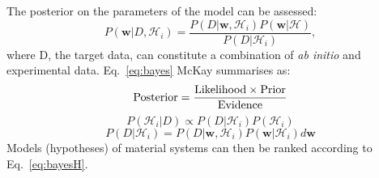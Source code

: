 The posterior on the parameters of the model can be assessed:
%
\begin{equation}
\label{eq:bayes}
P(\mathbf{w}|D, \mathcal{H}_{i}) = \frac{P(D|\mathbf{w}, \mathcal{H}_{i})P(\mathbf{w}|\mathcal{H})}{P(D|\mathcal{H}_{i})},
\end{equation}
%
where D, the target data, can constitute a combination of {\it ab initio} and experimental data. Eq.~\ref{eq:bayes}
McKay summarises as:
\begin{equation}
{\rm Posterior} = \frac{{\rm Likelihood} \times {\rm Prior}}{{\rm Evidence}}
\end{equation}
%
\begin{equation}
\label{eq:bayesH}
P(\mathcal{H}_{i}|D) \propto P(D|\mathcal{H}_{i})P(\mathcal{H}_{i})
\end{equation}
%
\begin{equation}
\label{eq:bayesH}
P(D|\mathcal{H}_{i}) = P(D|\mathbf{w}, \mathcal{H}_{i})P(\mathbf{w}|\mathcal{H}_{i})d\mathbf{w}
\end{equation}
%
Models (hypotheses) of material systems can then be ranked according to Eq.~\ref{eq:bayesH}.

